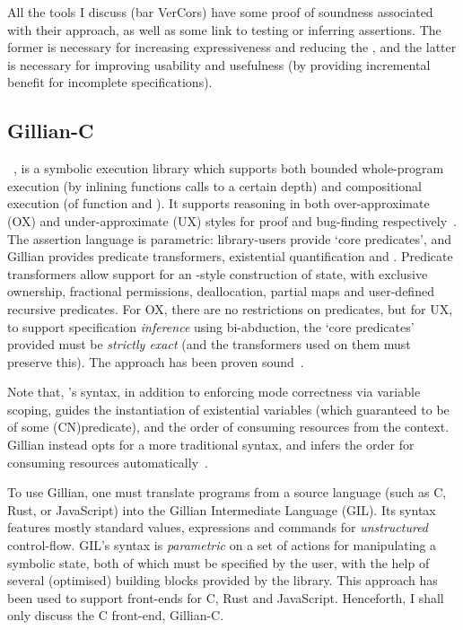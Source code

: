 All the tools I discuss (bar VerCors) have some proof of soundness associated
with their approach, as well as some link to testing or inferring assertions.
The former is necessary for increasing expressiveness and reducing the
, and the latter is necessary for improving usability and usefulness
(by providing incremental benefit for incomplete specifications).

\subsection{Gillian-C}

~, is a symbolic execution library
which supports both bounded whole-program execution (by inlining functions
calls to a certain depth) and compositional execution (of function
 and ). It supports reasoning in both
over-approximate (OX) and under-approximate (UX) styles for proof and
bug-finding respectively~. The assertion
language is parametric: library-users provide `core predicates', and Gillian
provides predicate transformers, existential quantification and . Predicate transformers allow support for an -style
construction of state, with exclusive ownership, fractional permissions,
deallocation, partial maps and user-defined recursive predicates. For OX,
there are no restrictions on predicates, but for UX, to support specification
\emph{inference} using bi-abduction, the `core predicates' provided must be
\emph{strictly exact} (and the transformers used on them must preserve this).
The approach has been proven sound~.


Note that, 's syntax, in addition to enforcing mode correctness via
variable scoping, guides the instantiation of existential variables (which
guaranteed to be  of some \kl(CN){predicate}), and the order
of consuming resources from the context. Gillian instead opts for a more
traditional  syntax, and infers the order for consuming
resources automatically~.

To use Gillian, one must translate programs from a source language (such as C,
Rust, or JavaScript) into the Gillian Intermediate Language (GIL). Its syntax
features mostly standard values, expressions and commands for
\emph{unstructured} control-flow. GIL's syntax is \emph{parametric} on a set of
actions for manipulating a symbolic state, both of which must be specified by
the user, with the help of several (optimised) building blocks provided by the
library. This approach has been used to support front-ends for C, Rust and
JavaScript. Henceforth, I shall only discuss the C front-end, Gillian-C.

